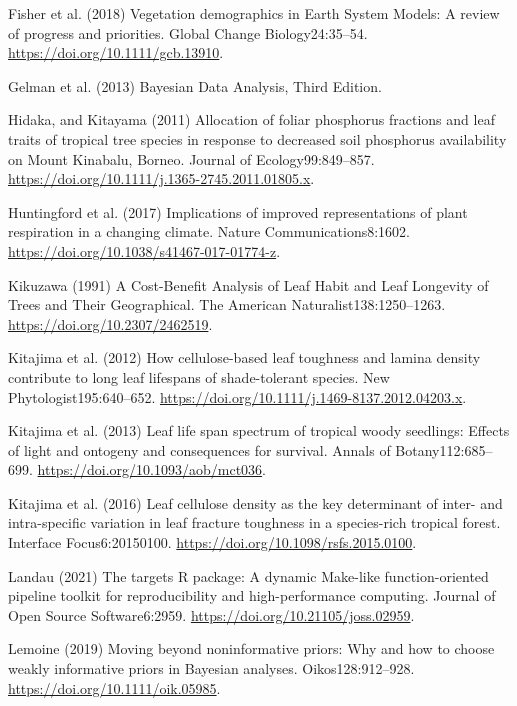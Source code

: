 \documentclass[
  12pt,
  letterpaper,
  DIV=11,
  numbers=noendperiod]{scrartcl}
\newlength{\cslhangindent}
\newenvironment{CSLReferences}[2] %
 {\begin{list}{}{%
  \setlength{\itemindent}{0pt}
  \setlength{\leftmargin}{0pt}
  \setlength{\parsep}{0pt}
  \ifodd #1
   \setlength{\leftmargin}{\cslhangindent}
   \setlength{\itemindent}{-1\cslhangindent}
  \fi
  \setlength{\itemsep}{#2\baselineskip}}}
 {\end{list}}
\begin{document}
\begin{CSLReferences}{1}{1}
Fisher et al. (2018) Vegetation demographics in {Earth System Models}:
{A} review of progress and priorities. Global Change Biology24:35--54.
\url{https://doi.org/10.1111/gcb.13910}.

Gelman et al. (2013) Bayesian {Data Analysis}, {Third Edition}.

Hidaka, and Kitayama (2011) Allocation of foliar phosphorus fractions
and leaf traits of tropical tree species in response to decreased soil
phosphorus availability on {Mount Kinabalu}, {Borneo}. Journal of
Ecology99:849--857.
\url{https://doi.org/10.1111/j.1365-2745.2011.01805.x}.

Huntingford et al. (2017) Implications of improved representations of
plant respiration in a changing climate. Nature Communications8:1602.
\url{https://doi.org/10.1038/s41467-017-01774-z}.

Kikuzawa (1991) A {Cost-Benefit Analysis} of {Leaf Habit} and {Leaf
Longevity} of {Trees} and {Their Geographical}. The American
Naturalist138:1250--1263. \url{https://doi.org/10.2307/2462519}.

Kitajima et al. (2012) How cellulose-based leaf toughness and lamina
density contribute to long leaf lifespans of shade-tolerant species. New
Phytologist195:640--652.
\url{https://doi.org/10.1111/j.1469-8137.2012.04203.x}.

Kitajima et al. (2013) Leaf life span spectrum of tropical woody
seedlings: {Effects} of light and ontogeny and consequences for
survival. Annals of Botany112:685--699.
\url{https://doi.org/10.1093/aob/mct036}.

Kitajima et al. (2016) Leaf cellulose density as the key determinant of
inter- and intra-specific variation in leaf fracture toughness in a
species-rich tropical forest. Interface Focus6:20150100.
\url{https://doi.org/10.1098/rsfs.2015.0100}.

Landau (2021) The targets {R} package: A dynamic {Make-like}
function-oriented pipeline toolkit for reproducibility and
high-performance computing. Journal of Open Source Software6:2959.
\url{https://doi.org/10.21105/joss.02959}.

Lemoine (2019) Moving beyond noninformative priors: Why and how to
choose weakly informative priors in {Bayesian} analyses.
Oikos128:912--928. \url{https://doi.org/10.1111/oik.05985}.


\end{CSLReferences}
\end{document}
